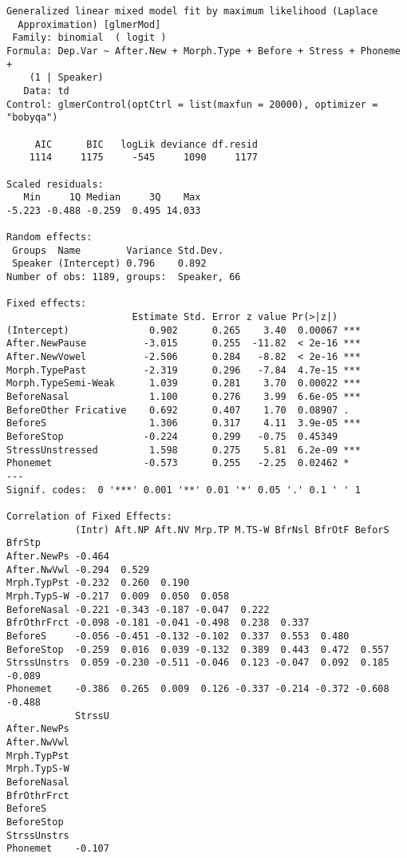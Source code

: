 \documentclass[
  10pt,
  letterpaper]{article}
\begin{document}
\begin{verbatim}
Generalized linear mixed model fit by maximum likelihood (Laplace
  Approximation) [glmerMod]
 Family: binomial  ( logit )
Formula: Dep.Var ~ After.New + Morph.Type + Before + Stress + Phoneme +  
    (1 | Speaker)
   Data: td
Control: glmerControl(optCtrl = list(maxfun = 20000), optimizer = "bobyqa")

     AIC      BIC   logLik deviance df.resid 
    1114     1175     -545     1090     1177 

Scaled residuals: 
   Min     1Q Median     3Q    Max 
-5.223 -0.488 -0.259  0.495 14.033 

Random effects:
 Groups  Name        Variance Std.Dev.
 Speaker (Intercept) 0.796    0.892   
Number of obs: 1189, groups:  Speaker, 66

Fixed effects:
                      Estimate Std. Error z value Pr(>|z|)    
(Intercept)              0.902      0.265    3.40  0.00067 ***
After.NewPause          -3.015      0.255  -11.82  < 2e-16 ***
After.NewVowel          -2.506      0.284   -8.82  < 2e-16 ***
Morph.TypePast          -2.319      0.296   -7.84  4.7e-15 ***
Morph.TypeSemi-Weak      1.039      0.281    3.70  0.00022 ***
BeforeNasal              1.100      0.276    3.99  6.6e-05 ***
BeforeOther Fricative    0.692      0.407    1.70  0.08907 .  
BeforeS                  1.306      0.317    4.11  3.9e-05 ***
BeforeStop              -0.224      0.299   -0.75  0.45349    
StressUnstressed         1.598      0.275    5.81  6.2e-09 ***
Phonemet                -0.573      0.255   -2.25  0.02462 *  
---
Signif. codes:  0 '***' 0.001 '**' 0.01 '*' 0.05 '.' 0.1 ' ' 1

Correlation of Fixed Effects:
            (Intr) Aft.NP Aft.NV Mrp.TP M.TS-W BfrNsl BfrOtF BeforS BfrStp
After.NewPs -0.464                                                        
After.NwVwl -0.294  0.529                                                 
Mrph.TypPst -0.232  0.260  0.190                                          
Mrph.TypS-W -0.217  0.009  0.050  0.058                                   
BeforeNasal -0.221 -0.343 -0.187 -0.047  0.222                            
BfrOthrFrct -0.098 -0.181 -0.041 -0.498  0.238  0.337                     
BeforeS     -0.056 -0.451 -0.132 -0.102  0.337  0.553  0.480              
BeforeStop  -0.259  0.016  0.039 -0.132  0.389  0.443  0.472  0.557       
StrssUnstrs  0.059 -0.230 -0.511 -0.046  0.123 -0.047  0.092  0.185 -0.089
Phonemet    -0.386  0.265  0.009  0.126 -0.337 -0.214 -0.372 -0.608 -0.488
            StrssU
After.NewPs       
After.NwVwl       
Mrph.TypPst       
Mrph.TypS-W       
BeforeNasal       
BfrOthrFrct       
BeforeS           
BeforeStop        
StrssUnstrs       
Phonemet    -0.107
\end{verbatim}
\end{document}
